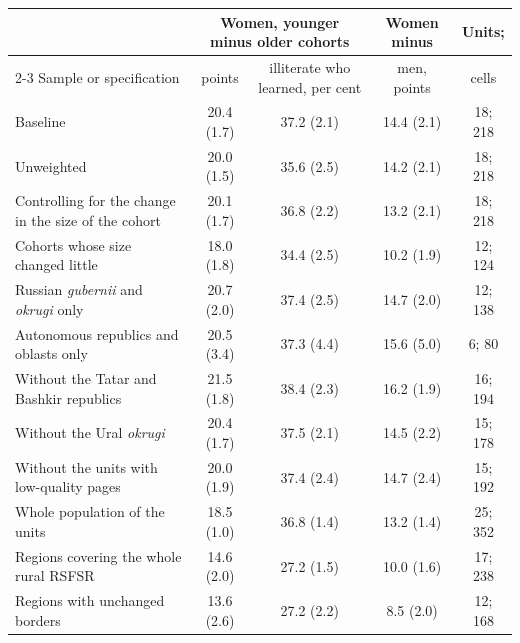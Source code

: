 \begin{tabular}{lcccc}
\toprule
 & \multicolumn{2}{c}{Women, younger minus older cohorts} & Women minus & Units; \\
\cmidrule(lr){2-3}
Sample or specification & points & illiterate who learned, per cent & men, points & cells \\
\midrule
Baseline & 20.4 (1.7) & 37.2 (2.1) & 14.4 (2.1) & 18; 218 \\
Unweighted & 20.0 (1.5) & 35.6 (2.5) & 14.2 (2.1) & 18; 218 \\
Controlling for the change in the size of the cohort & 20.1 (1.7) & 36.8 (2.2) & 13.2 (2.1) & 18; 218 \\
Cohorts whose size changed little & 18.0 (1.8) & 34.4 (2.5) & 10.2 (1.9) & 12; 124 \\
Russian \emph{gubernii} and \emph{okrugi} only & 20.7 (2.0) & 37.4 (2.5) & 14.7 (2.0) & 12; 138 \\
Autonomous republics and oblasts only & 20.5 (3.4) & 37.3 (4.4) & 15.6 (5.0) & 6; 80 \\
Without the Tatar and Bashkir republics & 21.5 (1.8) & 38.4 (2.3) & 16.2 (1.9) & 16; 194 \\
Without the Ural \emph{okrugi} & 20.4 (1.7) & 37.5 (2.1) & 14.5 (2.2) & 15; 178 \\
Without the units with low-quality pages & 20.0 (1.9) & 37.4 (2.4) & 14.7 (2.4) & 15; 192 \\
Whole population of the units & 18.5 (1.0) & 36.8 (1.4) & 13.2 (1.4) & 25; 352 \\
\midrule
Regions covering the whole rural RSFSR & 14.6 (2.0) & 27.2 (1.5) & 10.0 (1.6) & 17; 238 \\
Regions with unchanged borders & 13.6 (2.6) & 27.2 (2.2) & 8.5 (2.0) & 12; 168 \\
\bottomrule
\end{tabular}
